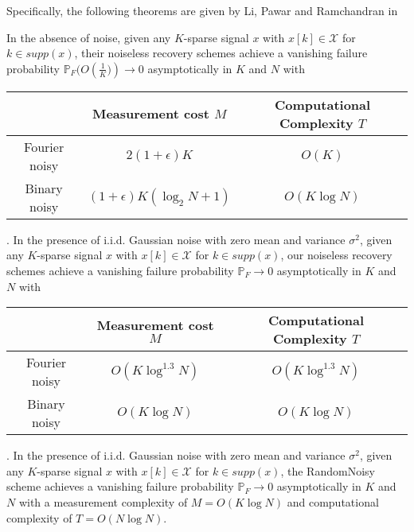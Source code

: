 \documentclass[conference,onecolumn]{IEEEtran}
\begin{document}
Specifically, the following theorems are given by Li, Pawar and Ramchandran in \cite{li2015subdraft}
\begin{theorem}\label{thm:li1}
In the absence of noise, given any $K$-sparse signal $x$ with $x[k] \in \mathcal{X}$ for $k \in supp (x)$, their noiseless recovery schemes achieve a vanishing failure probability $\mathbb{P}_F(O\left(\frac{1}{K})\right) \rightarrow 0$ asymptotically in $K$ and $N$ with
\begin{center}
\begin{tabular}{|c|c|c|}
  \hline
   & Measurement cost $M$ &  Computational Complexity $T$ \\
  \hline
  Fourier noisy & $2(1+\epsilon)K$ & $O(K)$ \\
  \hline
  Binary noisy & $(1+\epsilon)K(\log_2 N+1)$ & $O(K \log N)$ \\
  \hline
\end{tabular}
\end{center}
\end{theorem}
\vspace{2ex}


\begin{theorem}\label{thm:li2}. In the presence of i.i.d. Gaussian noise with zero mean and
variance $\sigma^2$, given any $K$-sparse signal $x$ with $x[k] \in \mathcal{X}$ for $k \in supp (x)$, our noiseless recovery schemes achieve a vanishing failure probability $\mathbb{P}_F \rightarrow 0$ asymptotically in $K$ and $N$ with
\begin{center}
\begin{tabular}{|c|c|c|}
  \hline
   & Measurement cost $M$ &  Computational Complexity $T$ \\
  \hline
  Fourier noisy & $O(K \log^{1.3}N)$ & $O(K \log^{1.3}N)$ \\
  \hline
  Binary noisy & $O(K \log N)$ & $O(K \log N)$ \\
  \hline
\end{tabular}
\end{center}
\end{theorem}
\vspace{2ex}

\begin{theorem}\label{thm:li3}. In the presence of i.i.d. Gaussian noise with zero mean and
variance $\sigma^2$, given any $K$-sparse signal $x$ with $x[k] \in \mathcal{X}$ for $k \in supp (x)$, the RandomNoisy scheme achieves a vanishing failure probability $\mathbb{P}_F \rightarrow 0$ asymptotically in $K$ and $N$ with a measurement complexity of $M = O(K \log N)$ and computational complexity of $T = O(N \log N)$.
\end{theorem}
\end{document}
